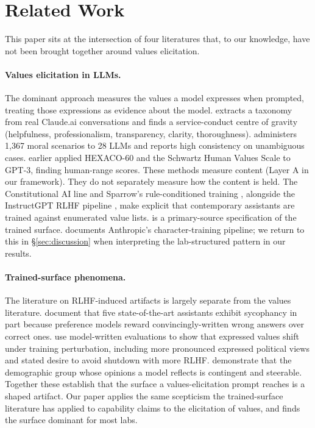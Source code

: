\section{Related Work}
\label{sec:background}

This paper sits at the intersection of four literatures that, to our knowledge, have not been brought together around values elicitation.

\paragraph{Values elicitation in LLMs.}
The dominant approach measures the values a model expresses when prompted, treating those expressions as evidence about the model. \citet{huang2025values} extracts a taxonomy from real Claude.ai conversations and finds a service-conduct centre of gravity (helpfulness, professionalism, transparency, clarity, thoroughness). \citet{scherrer2023evaluating} administers 1{,}367 moral scenarios to 28 LLMs and reports high consistency on unambiguous cases. \citet{miotto2022whois} earlier applied HEXACO-60 and the Schwartz Human Values Scale to GPT-3, finding human-range scores. These methods measure content (Layer A in our framework). They do not separately measure how the content is held. The Constitutional AI line \citep{bai2022constitutional} and Sparrow's rule-conditioned training \citep{glaese2022improving}, alongside the InstructGPT RLHF pipeline \citep{ouyang2022training}, make explicit that contemporary assistants are trained against enumerated value lists. \citet{openai2025modelspec} is a primary-source specification of the trained surface. \citet{anthropic2024character} documents Anthropic's character-training pipeline; we return to this in \S\ref{sec:discussion} when interpreting the lab-structured pattern in our results.

\paragraph{Trained-surface phenomena.}
The literature on RLHF-induced artifacts is largely separate from the values literature. \citet{sharma2024sycophancy} document that five state-of-the-art assistants exhibit sycophancy in part because preference models reward convincingly-written wrong answers over correct ones. \citet{perez2023discovering} use model-written evaluations to show that expressed values shift under training perturbation, including more pronounced expressed political views and stated desire to avoid shutdown with more RLHF. \citet{santurkar2023whose} demonstrate that the demographic group whose opinions a model reflects is contingent and steerable. Together these establish that the surface a values-elicitation prompt reaches is a shaped artifact. Our paper applies the same scepticism the trained-surface literature has applied to capability claims to the elicitation of values, and finds the surface dominant for most labs.

